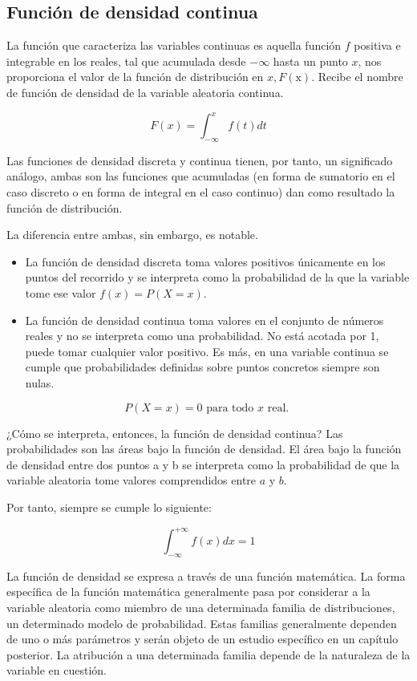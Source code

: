\documentclass[
  a4paper,
  DIV=11,
  numbers=noendperiod]{scrreprt}
\providecommand{\tightlist}{%
  \setlength{\itemsep}{0pt}\setlength{\parskip}{0pt}}\usepackage{longtable,booktabs,array}
\begin{document}
\subsection{Función de densidad
continua}\label{funciuxf3n-de-densidad-continua}

La función que caracteriza las variables continuas es aquella función
\(f\) positiva e integrable en los reales, tal que acumulada desde
\(-\infty\) hasta un punto \(x\), nos proporciona el valor de la función
de distribución en \(x, F(\mathrm{x})\). Recibe el nombre de función de
densidad de la variable aleatoria continua.

\[
F(x)=\int_{-\infty}^{x} f(t) d t
\]

Las funciones de densidad discreta y continua tienen, por tanto, un
significado análogo, ambas son las funciones que acumuladas (en forma de
sumatorio en el caso discreto o en forma de integral en el caso
continuo) dan como resultado la función de distribución.

La diferencia entre ambas, sin embargo, es notable.

\begin{itemize}
\tightlist
\item
  La función de densidad discreta toma valores positivos únicamente en
  los puntos del recorrido y se interpreta como la probabilidad de la
  que la variable tome ese valor \(f(x)=P(X=x)\).
\item
  La función de densidad continua toma valores en el conjunto de números
  reales y no se interpreta como una probabilidad. No está acotada por
  1, puede tomar cualquier valor positivo. Es más, en una variable
  continua se cumple que probabilidades definidas sobre puntos concretos
  siempre son nulas.
\end{itemize}

\[
P(X=x)=0 \text { para todo } x \text { real. }
\]

¿Cómo se interpreta, entonces, la función de densidad continua? Las
probabilidades son las áreas bajo la función de densidad. El área bajo
la función de densidad entre dos puntos a y b se interpreta como la
probabilidad de que la variable aleatoria tome valores comprendidos
entre \(a\) y \(b\).

Por tanto, siempre se cumple lo siguiente:

\[
\int_{-\infty}^{+\infty} f(x) d x=1
\]

La función de densidad se expresa a través de una función matemática. La
forma específica de la función matemática generalmente pasa por
considerar a la variable aleatoria como miembro de una determinada
familia de distribuciones, un determinado modelo de probabilidad. Estas
familias generalmente dependen de uno o más parámetros y serán objeto de
un estudio específico en un capítulo posterior. La atribución a una
determinada familia depende de la naturaleza de la variable en cuestión.
\end{document}
